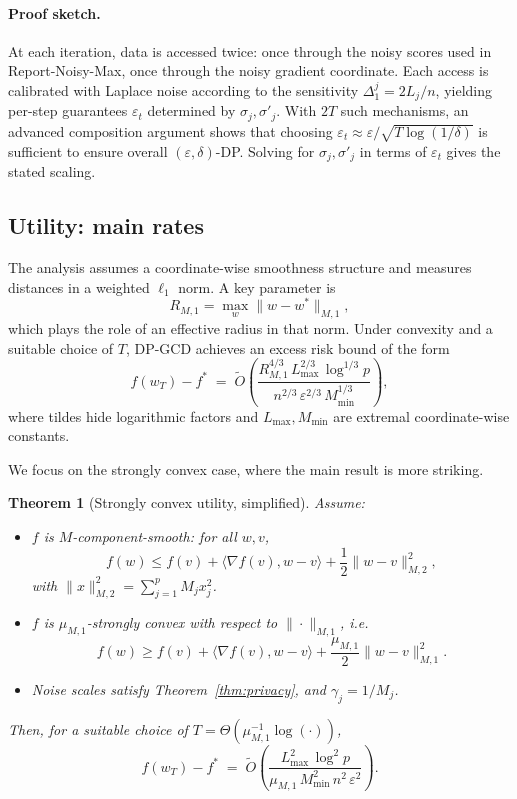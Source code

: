 \documentclass[11pt,a4paper]{article}
\newtheorem{theorem}{Theorem}
\begin{document}
\paragraph{Proof sketch.}
At each iteration, data is accessed twice: once through the noisy scores used in Report-Noisy-Max, once through the noisy gradient coordinate. Each access is calibrated with Laplace noise according to the sensitivity \(\Delta^j_1 = 2L_j/n\), yielding per-step guarantees \(\varepsilon_t\) determined by \(\sigma_j,\sigma'_j\). With \(2T\) such mechanisms, an advanced composition argument shows that choosing \(\varepsilon_t \approx \varepsilon / \sqrt{T \log(1/\delta)}\) is sufficient to ensure overall \((\varepsilon,\delta)\)-DP. Solving for \(\sigma_j,\sigma'_j\) in terms of \(\varepsilon_t\) gives the stated scaling.

\subsection{Utility: main rates}

The analysis assumes a coordinate-wise smoothness structure and measures distances in a weighted \(\ell_1\) norm. A key parameter is
\[
  R_{M,1} = \max_{w} \|w - w^*\|_{M,1},
\]
which plays the role of an effective radius in that norm. Under convexity and a suitable choice of \(T\), DP-GCD achieves an excess risk bound of the form
\[
  f(w_T) - f^* \;=\; \tilde O\left( \frac{R_{M,1}^{4/3} \, L_{\max}^{2/3} \, \log^{1/3} p}{n^{2/3} \, \varepsilon^{2/3} \, M_{\min}^{1/3}} \right),
\]
where tildes hide logarithmic factors and \(L_{\max}, M_{\min}\) are extremal coordinate-wise constants.

We focus on the strongly convex case, where the main result is more striking.

\begin{theorem}[Strongly convex utility, simplified]
\label{thm:sc}
Assume:
\begin{itemize}
  \item \(f\) is \(M\)-component-smooth: for all \(w,v\),
  \[
    f(w) \le f(v) + \langle \nabla f(v), w-v\rangle
      + \frac{1}{2} \|w-v\|_{M,2}^2,
  \]
  with \(\|x\|_{M,2}^2 = \sum_{j=1}^p M_j x_j^2\).
  \item \(f\) is \(\mu_{M,1}\)-strongly convex with respect to \(\|\cdot\|_{M,1}\), i.e.
  \[
    f(w) \ge f(v) + \langle \nabla f(v), w-v\rangle
      + \frac{\mu_{M,1}}{2} \|w-v\|_{M,1}^2.
  \]
  \item Noise scales satisfy Theorem~\ref{thm:privacy}, and
    \(\gamma_j = 1/M_j\).
\end{itemize}
Then, for a suitable choice of \(T = \Theta(\mu_{M,1}^{-1} \log(\cdot))\),
\[
  f(w_T) - f^* \;=\; \tilde O\left(
    \frac{L_{\max}^2 \, \log^2 p}{\mu_{M,1} \, M_{\min}^2 \, n^2 \, \varepsilon^2}
  \right).
\]
\end{theorem}
\end{document}
